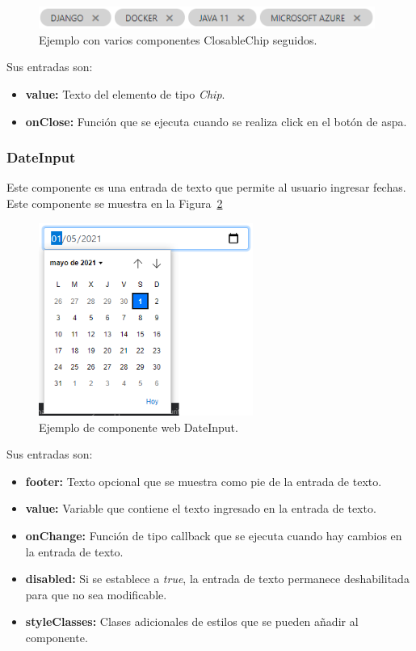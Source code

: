 \documentclass[a4paper, 12pt]{book}
\begin{document}
\begin{figure}
  \centering
  \includegraphics[width=11cm, keepaspectratio]{img/ClosableChip.PNG}
  \caption{Ejemplo con varios componentes ClosableChip seguidos.}\label{fig:component_closable_chip}
\end{figure}

Sus entradas son:

		\begin{itemize}
		\item \textbf{value:} Texto del elemento de tipo \emph{Chip}.
		\item \textbf{onClose:} Función que se ejecuta cuando se realiza click en el botón de aspa.
		\end{itemize}


\subsubsection{DateInput}
\label{subsec:wc_date_input}
Este componente es una entrada de texto que permite al usuario ingresar fechas.
Este componente se muestra en la Figura~\ref{fig:component_date_input}

\begin{figure}
  \centering
  \includegraphics[width=7cm, keepaspectratio]{img/DateInput.PNG}
  \caption{Ejemplo de componente web DateInput.}\label{fig:component_date_input}
\end{figure}

Sus entradas son:

		\begin{itemize}
		\item \textbf{footer:} Texto opcional que se muestra como pie de la entrada de texto.
		\item \textbf{value:} Variable que contiene el texto ingresado en la entrada de texto.
		\item \textbf{onChange:} Función de tipo callback que se ejecuta cuando hay cambios en la entrada de texto.
		\item \textbf{disabled:} Si se establece a \emph{true}, la entrada de texto permanece deshabilitada para que no sea modificable.
		\item \textbf{styleClasses:} Clases adicionales de estilos que se pueden añadir al componente.
		\end{itemize}
\end{document}
